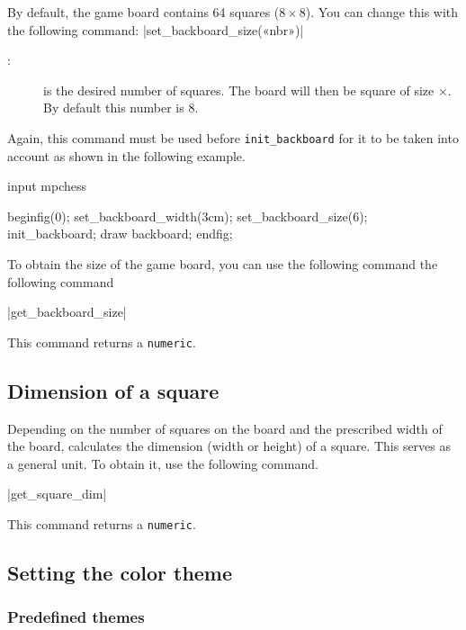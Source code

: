 \documentclass[english]{ltxdoc}
\begin{document}
By default, the game board contains 64 squares ($8\times 8$). You can change
this with the following command: 
\commande|set_backboard_size(«nbr»)|
\smallskip{}

\begin{description}
  \item[:] is the desired number of squares. The board will then be
  square of size $\times$. By default this number is 8. 
\end{description}

Again, this command must be used before \lstinline+init_backboard+ for it to be
taken into account as shown in the following example. 

\begin{ExempleMP}[label=ex:widthcase]
input mpchess

beginfig(0);
set_backboard_width(3cm);
set_backboard_size(6);
init_backboard;
draw backboard;
endfig;
\end{ExempleMP}

To obtain the size of the game board, you can use the following command the
following command 

\commande|get_backboard_size|\smallskip{}

This command returns a \lstinline+numeric+.

\subsection{Dimension of a square}

Depending on the number of squares on the board and the prescribed width of the board, \mpchess calculates the dimension (width or height) of a square. This
serves as a general unit. To obtain it, use the following command.

\commande|get_square_dim|\smallskip{}

This command returns a \lstinline+numeric+.

\subsection{Setting the color theme}

\subsubsection{Predefined themes}
\end{document}
